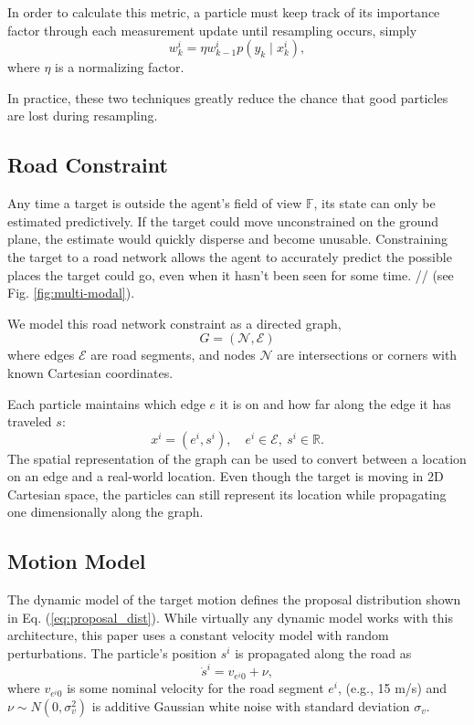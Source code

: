 \documentclass[letterpaper, 10 pt, conference]{ieeeconf}  %
\begin{document}
In order to calculate this metric, a particle must keep track of its importance factor through each measurement update until resampling occurs, simply
\begin{equation}%
    w^i_k = \eta w^i_{k-1} p(y_k \mid x^i_k),
\end{equation}
where $\eta$ is a normalizing factor.

In practice, these two techniques greatly reduce the chance that good particles are lost during resampling.

\subsection{Road Constraint}

Any time a target is outside the agent's field of view $\mathbb{F}$, its state can only be estimated predictively. If the target could move unconstrained on the ground plane, the estimate would quickly disperse and become unusable. Constraining the target to a road network allows the agent to accurately predict the possible places the target could go, even when it hasn't been seen for some time. // (see Fig. \ref{fig:multi-modal}).

We model this road network constraint as a directed graph,
\begin{equation}%
    G = (\mathcal{N}, \mathcal{E})
\end{equation}
where edges $\mathcal{E}$ are road segments, and nodes $\mathcal{N}$ are intersections or corners with known Cartesian coordinates.

Each particle maintains which edge $e$ it is on and how far along the edge it has traveled $s$:
\begin{equation}%
    x^i = (e^i, s^i), \quad e^i \in \mathcal{E},\ s^i \in \mathbb{R}.
\end{equation}
The spatial representation of the graph can be used to convert between a location on an edge and a real-world location. Even though the target is moving in 2D Cartesian space, the particles can still represent its location while propagating one dimensionally along the graph.

\subsection{Motion Model}

The dynamic model of the target motion defines the proposal distribution shown in Eq. (\ref{eq:proposal_dist}). While virtually any dynamic model works with this architecture, this paper uses a constant velocity model with random perturbations. The particle's position $s^i$ is propagated along the road as
\begin{equation}%
    \dot{s}^i = v_{e^{i}0} + \nu,
\end{equation}
where $v_{e^{i}0}$ is some nominal velocity for the road segment $e^i$, (e.g., 15 m/s) and $\nu \sim N(0, \sigma_v^2)$ is additive Gaussian white noise with standard deviation $\sigma_v$.
\end{document}
